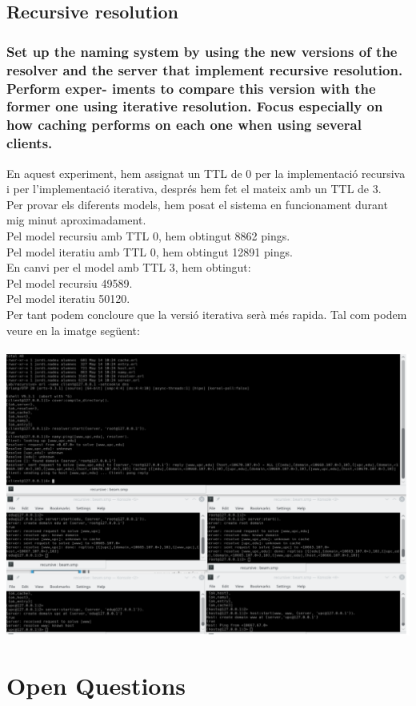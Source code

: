 \documentclass[a4paper, 10pt]{article}
\begin{document}
\newpage
\subsection{Recursive resolution}
\subsubsection{Set up the naming system by using the new versions of the resolver and the server that implement recursive resolution. Perform exper- iments to compare this version with the former one using iterative resolution. Focus especially on how caching performs on each one when using several clients.}
En aquest experiment, hem assignat un TTL de 0 per la implementació recursiva i per l'implementació iterativa, després hem fet el mateix amb un TTL de 3.\\
Per provar els diferents models, hem posat el sistema en funcionament durant mig minut aproximadament.\\
Pel model recursiu amb TTL 0, hem obtingut 8862 pings.\\
Pel model iteratiu amb TTL 0, hem obtingut 12891 pings.\\
 En canvi per el model amb TTL 3, hem obtingut:\\
Pel model recursiu 49589.\\ 
Pel model iteratiu 50120.\\ 
Per tant podem concloure que la versió iterativa serà més rapida. Tal com podem veure en la imatge següent:\\\\
\includegraphics[width=\textwidth]{Ex5.png}

\newpage\section{Open Questions}
\end{document}
